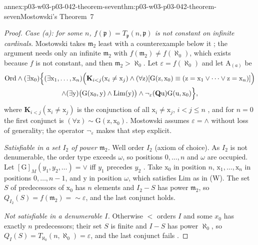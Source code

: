 \begin{annexitem}{annex:p03-w03-p03-042-theorem-seven}{thm:p03-w03-p03-042-theorem-seven}{Mostowski's Theorem~7}
\begin{proof}
\emph{Case (a): for some \(n\), \(f(\mathfrak p)=T_{\mathfrak p}(n,
\mathfrak p)\) is not constant on infinite cardinals.}  Mostowski takes
\(\mathfrak m_2\) least with a counterexample below it
\cite[p.~24]{Mostowski1957}; the argument needs only an infinite
\(\mathfrak m_2\) with \(f(\mathfrak m_2)\neq f(\aleph_0)\), which exists
because \(f\) is not constant, and then \(\mathfrak m_2>\aleph_0\).  Let
\(\varepsilon=f(\aleph_0)\) and let \(\mathrm A_{(a)}\) be
\begin{multline*}
\mathrm{Ord}\wedge(\exists\mathrm x_0)\Bigl\{(\exists\mathrm x_1,\ldots,
\mathrm x_n)\Bigl(\mathbf K_{i<j}(\mathrm x_i\neq\mathrm x_j)\wedge
(\forall\mathrm z)[\mathrm G(\mathrm z,\mathrm x_0)\equiv(\mathrm z=
\mathrm x_1\vee\cdots\vee\mathrm z=\mathrm x_n)]\Bigr)\\
\wedge(\exists\mathrm y)\bigl(\mathrm G(\mathrm x_0,\mathrm y)\wedge
\mathrm{Lim}(\mathrm y)\bigr)\wedge\neg_\varepsilon(\mathbf Q\mathrm u)
\mathrm G(\mathrm u,\mathrm x_0)\Bigr\},
\end{multline*}
where \(\mathbf K_{i<j}(\mathrm x_i\neq\mathrm x_j)\) is the conjunction of
all \(\mathrm x_i\neq\mathrm x_j\), \(i<j\le n\)
\cite[p.~24]{Mostowski1957}, and for \(n=0\) the first conjunct is
\((\forall\mathrm z){\sim}\mathrm G(\mathrm z,\mathrm x_0)\).  Mostowski
assumes \(\varepsilon=\wedge\) without loss of generality; the operator
\(\neg_\varepsilon\) makes that step explicit.

\emph{Satisfiable in a set \(I_2\) of power \(\mathfrak m_2\).}  Well order
\(I_2\) (axiom of choice).  As \(I_2\) is not denumerable, the order type
exceeds \(\omega\), so positions \(0,\ldots,n\) and \(\omega\) are
occupied.  Let \([\mathrm G]_M(y_1,y_2,\ldots)=\vee\) iff \(y_1\) precedes
\(y_2\) \cite[p.~24]{Mostowski1957}.  Take \(\mathrm x_0\) in position
\(n\), \(\mathrm x_1,\ldots,\mathrm x_n\) in positions \(0,\ldots,n-1\),
and \(\mathrm y\) in position \(\omega\), which satisfies \(\mathrm{Lim}\)
as in (W).  The set \(S\) of predecessors of \(\mathrm x_0\) has \(n\)
elements and \(I_2-S\) has power \(\mathfrak m_2\), so
\(Q_{I_2}(S)=f(\mathfrak m_2)={\sim}\varepsilon\), and the last conjunct
holds.

\emph{Not satisfiable in a denumerable \(I\).}  Otherwise \(<\) orders
\(I\) and some \(x_0\) has exactly \(n\) predecessors; their set \(S\) is
finite and \(I-S\) has power \(\aleph_0\), so \(Q_I(S)=T_{\aleph_0}(n,
\aleph_0)=\varepsilon\), and the last conjunct fails
\cite[pp.~24--25]{Mostowski1957}.


\end{proof}
\end{annexitem}
